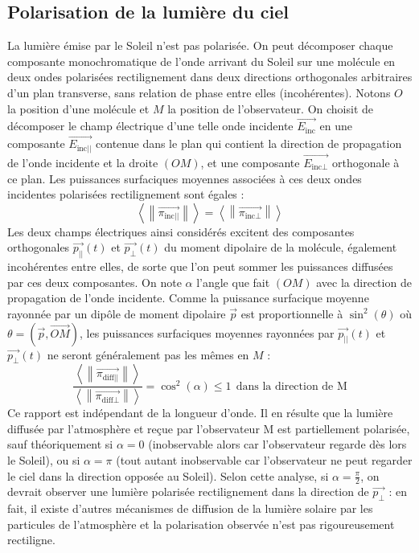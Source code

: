 \documentclass[french]{book}
\theoremstyle{plain}
\theoremstyle{definition}
\theoremstyle{remark}
\begin{document}
\subsection{Polarisation de la lumière du ciel}
La lumière émise par le Soleil n'est pas polarisée. On peut décomposer chaque composante monochromatique de l'onde arrivant du Soleil sur une molécule en deux ondes polarisées rectilignement dans deux directions orthogonales arbitraires d'un plan transverse, sans relation de phase entre elles (incohérentes). Notons $O$ la position d'une molécule et $M$ la position de l'observateur. On choisit de décomposer le champ électrique d'une telle onde incidente $\overrightarrow{E_\text{inc}}$ en une composante $\overrightarrow{E_{\text{inc}||}}$ contenue dans le plan qui contient la direction de propagation de l'onde incidente et la droite $(OM)$, et une composante $\overrightarrow{E_{\text{inc}\bot}}$ orthogonale à ce plan. Les puissances surfaciques moyennes associées à ces deux ondes incidentes polarisées rectilignement sont égales : $$\left\langle\left\lVert\overrightarrow{\pi_{\text{inc}||}}\right\rVert \right\rangle=\left\langle\left\lVert\overrightarrow{\pi_{\text{inc}\bot}}\right\rVert \right\rangle$$ Les deux champs électriques ainsi considérés excitent des composantes orthogonales $\overrightarrow{p_{||}}(t)$ et $\overrightarrow{p_{\bot}}(t)$ du moment dipolaire de la molécule, également incohérentes entre elles, de sorte que l'on peut sommer les puissances diffusées par ces deux composantes. On note $\alpha$ l'angle que fait $(OM)$ avec la direction de propagation de l'onde incidente. Comme la puissance surfacique moyenne rayonnée par un dipôle de moment dipolaire $\overrightarrow{p}$ est proportionnelle à $\sin^2(\theta)$ où $\theta=(\overrightarrow{p},\overrightarrow{OM})$, les puissances surfaciques moyennes rayonnées par $\overrightarrow{p_{||}}(t)$ et $\overrightarrow{p_{\bot}}(t)$ ne seront généralement pas les mêmes en $M$ : $$\displaystyle \frac{\left\langle\left\lVert\overrightarrow{\pi_{\text{diff}||}}\right\rVert \right\rangle}{\left\langle\left\lVert\overrightarrow{\pi_{\text{diff}\bot}}\right\rVert \right\rangle}=\cos^2(\alpha)\leqslant 1 \ \ \text{dans la direction de M}$$ Ce rapport est indépendant de la longueur d'onde. Il en résulte que la lumière diffusée par l'atmosphère et reçue par l'observateur M est partiellement polarisée, sauf théoriquement si $\alpha=0$ (inobservable alors car l'observateur regarde dès lors le Soleil), ou si $\alpha=\pi$ (tout autant inobservable car l'observateur ne peut regarder le ciel dans la direction opposée au Soleil). Selon cette analyse, si $\alpha=\displaystyle\frac{\pi}{2}$, on devrait observer une lumière polarisée rectilignement dans la direction de $\overrightarrow{p_\bot}$ : en fait, il existe d'autres mécanismes de diffusion de la lumière solaire par les particules de l'atmosphère et la polarisation observée n'est pas rigoureusement rectiligne.
\end{document}
